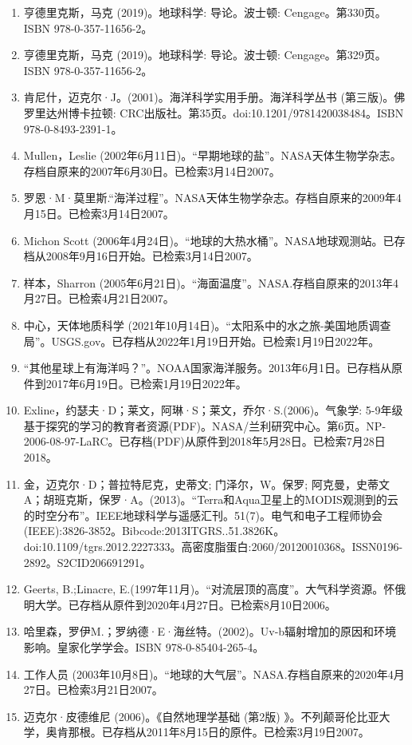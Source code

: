 \begin{enumerate}
\item 亨德里克斯，马克 (2019)。地球科学: 导论。波士顿: Cengage。第330页。ISBN 978-0-357-11656-2。
\item 亨德里克斯，马克 (2019)。地球科学: 导论。波士顿: Cengage。第329页。ISBN 978-0-357-11656-2。
\item 肯尼什，迈克尔·J。(2001)。海洋科学实用手册。海洋科学丛书 (第三版)。佛罗里达州博卡拉顿: CRC出版社。第35页。doi:10.1201/9781420038484。ISBN 978-0-8493-2391-1。
\item Mullen，Leslie (2002年6月11日)。“早期地球的盐”。NASA天体生物学杂志。存档自原来的2007年6月30日。已检索3月14日2007。
\item 罗恩·M·莫里斯.“海洋过程”。NASA天体生物学杂志。存档自原来的2009年4月15日。已检索3月14日2007。
\item Michon Scott (2006年4月24日)。“地球的大热水桶”。NASA地球观测站。已存档从2008年9月16日开始。已检索3月14日2007。
\item 样本，Sharron (2005年6月21日)。“海面温度”。NASA.存档自原来的2013年4月27日。已检索4月21日2007。
\item 中心，天体地质科学 (2021年10月14日)。“太阳系中的水之旅-美国地质调查局”。USGS.gov。已存档从2022年1月19日开始。已检索1月19日2022年。
\item “其他星球上有海洋吗？”。NOAA国家海洋服务。2013年6月1日。已存档从原件到2017年6月19日。已检索1月19日2022年。
\item Exline，约瑟夫·D；莱文，阿琳·S；莱文，乔尔·S.(2006)。气象学: 5-9年级基于探究的学习的教育者资源(PDF)。NASA/兰利研究中心。第6页。NP-2006-08-97-LaRC。已存档(PDF)从原件到2018年5月28日。已检索7月28日2018。
\item 金，迈克尔·D；普拉特尼克，史蒂文; 门泽尔，W。保罗; 阿克曼，史蒂文A；胡班克斯，保罗·A。(2013)。“Terra和Aqua卫星上的MODIS观测到的云的时空分布”。IEEE地球科学与遥感汇刊。51(7)。电气和电子工程师协会 (IEEE):3826-3852。Bibcode:2013ITGRS..51.3826K。doi:10.1109/tgrs.2012.2227333。高密度脂蛋白:2060/20120010368。ISSN0196-2892。S2CID206691291。  
\item Geerts, B.;Linacre, E.(1997年11月)。“对流层顶的高度”。大气科学资源。怀俄明大学。已存档从原件到2020年4月27日。已检索8月10日2006。
\item 哈里森，罗伊M.；罗纳德·E·海丝特。(2002)。Uv-b辐射增加的原因和环境影响。皇家化学学会。ISBN 978-0-85404-265-4。
\item 工作人员 (2003年10月8日)。“地球的大气层”。NASA.存档自原来的2020年4月27日。已检索3月21日2007。
\item 迈克尔·皮德维尼 (2006)。《自然地理学基础 (第2版) 》。不列颠哥伦比亚大学，奥肯那根。已存档从2011年8月15日的原件。已检索3月19日2007。

\end{enumerate}
